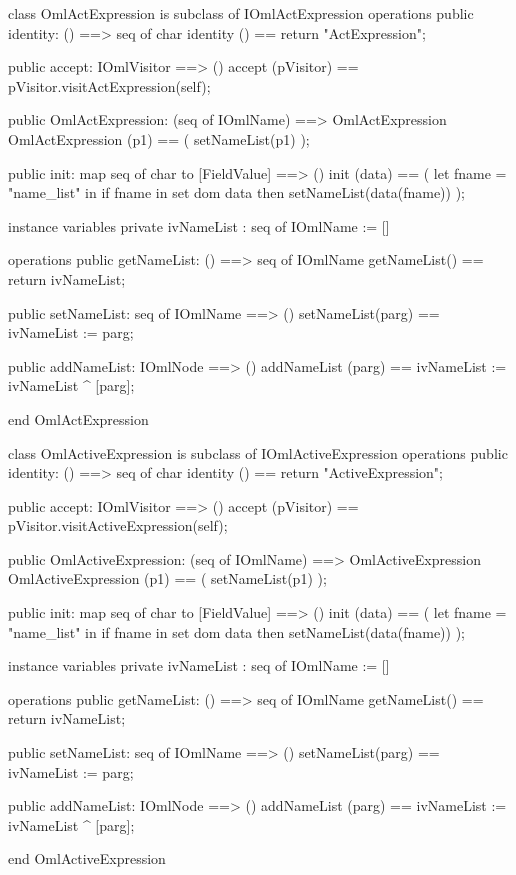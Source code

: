 \begin{vdm_al}
class OmlActExpression is subclass of IOmlActExpression
operations
  public identity: () ==> seq of char
  identity () == return "ActExpression";

  public accept: IOmlVisitor ==> ()
  accept (pVisitor) == pVisitor.visitActExpression(self);

  public OmlActExpression:
      (seq of IOmlName) ==> OmlActExpression
  OmlActExpression (p1) == 
   ( setNameList(p1) );

  public init: map seq of char to [FieldValue] ==> ()
  init (data) ==
    ( let fname = "name_list" in
        if fname in set dom data
        then setNameList(data(fname)) );

instance variables
  private ivNameList : seq of IOmlName := []

operations
  public getNameList: () ==> seq of IOmlName
  getNameList() == return ivNameList;

  public setNameList: seq of IOmlName ==> ()
  setNameList(parg) == ivNameList := parg;

  public addNameList: IOmlNode ==> ()
  addNameList (parg) == ivNameList := ivNameList ^ [parg];

end OmlActExpression
\end{vdm_al}

\begin{vdm_al}
class OmlActiveExpression is subclass of IOmlActiveExpression
operations
  public identity: () ==> seq of char
  identity () == return "ActiveExpression";

  public accept: IOmlVisitor ==> ()
  accept (pVisitor) == pVisitor.visitActiveExpression(self);

  public OmlActiveExpression:
      (seq of IOmlName) ==> OmlActiveExpression
  OmlActiveExpression (p1) == 
   ( setNameList(p1) );

  public init: map seq of char to [FieldValue] ==> ()
  init (data) ==
    ( let fname = "name_list" in
        if fname in set dom data
        then setNameList(data(fname)) );

instance variables
  private ivNameList : seq of IOmlName := []

operations
  public getNameList: () ==> seq of IOmlName
  getNameList() == return ivNameList;

  public setNameList: seq of IOmlName ==> ()
  setNameList(parg) == ivNameList := parg;

  public addNameList: IOmlNode ==> ()
  addNameList (parg) == ivNameList := ivNameList ^ [parg];

end OmlActiveExpression
\end{vdm_al}

